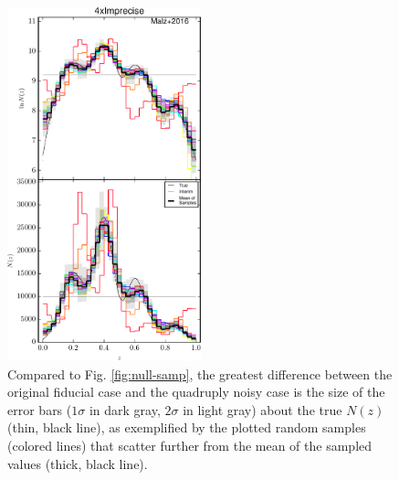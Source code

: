 \documentclass[preprint]{aastex}
\begin{document}
\begin{figure}
\includegraphics[width=0.5\textwidth]{figs/sig4/samps.pdf}
\caption{Compared to Fig. \ref{fig:null-samp}, the greatest difference between 
the original fiducial case and the quadruply noisy case is the size of the 
error bars ($1\sigma$ in dark gray, $2\sigma$ in light gray) about the true 
$N(z)$ (thin, black line), as exemplified by the plotted random samples 
(colored lines) that scatter further from the mean of the sampled values 
(thick, black line).}
\label{fig:sig4-samp}
\end{figure}
\end{document}
